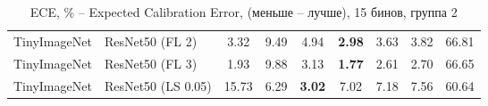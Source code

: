 \begin{table}[h!]
{\begin{tabular}{llccccccc}
TinyImageNet &             ResNet50 (FL 2) &                  3.32 &                  9.49 &                  4.94 & \textbf{2.98} &                  3.63 &                  3.82 &                 66.81 \\
TinyImageNet &             ResNet50 (FL 3) &                  1.93 &                  9.88 &                  3.13 & \textbf{1.77} &                  2.61 &                  2.70 &                 66.65 \\
TinyImageNet &          ResNet50 (LS 0.05) &                 15.73 &                  6.29 & \textbf{3.02} &                  7.02 &                  7.18 &                  7.56 &                 60.64 \\
\bottomrule
\end{tabular}%
}
\caption{ECE, \% -- Expected Calibration Error, (меньше -- лучше), 15 бинов, группа 2}
\label{tab:metrics:ECE_2}
\end{table}
